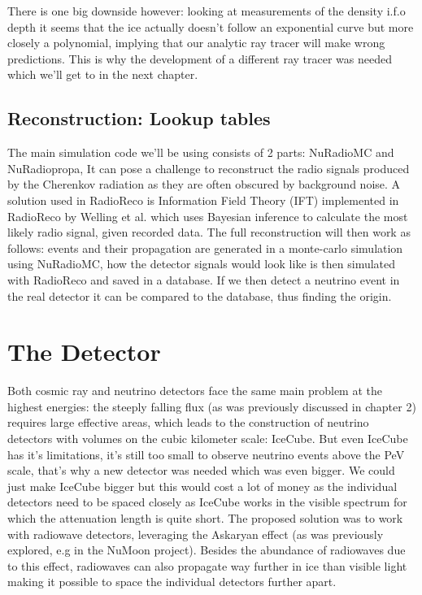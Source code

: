 \documentclass[11pt,a4paper,faculty=we,language=en,doctype=report]{cls/ugent-doc}
\begin{document}
There is one big downside however: looking at measurements of the density i.f.o depth
it seems that the ice actually doesn't follow an exponential curve but more closely
a polynomial, implying that our analytic ray tracer will make wrong predictions.
This is why the development of a different ray tracer was needed which we'll get to
in the next chapter.
\section{Reconstruction: Lookup tables}
The main simulation code we'll be using consists of 2 parts: 
NuRadioMC and NuRadiopropa,
It can pose a challenge to reconstruct the radio signals produced by
the Cherenkov radiation as they are often obscured by background
noise. A solution used in RadioReco is Information Field Theory
(IFT) implemented in RadioReco by Welling et al.\cite{Welling_2021}
which uses Bayesian inference to calculate the most likely radio
signal, given recorded data.  The full reconstruction will then work
as follows: events and their propagation are generated in a
monte-carlo simulation using
NuRadioMC\cite{Glaser_2019}\cite{Glaser_2020}, how the detector
signals would look like is then simulated with RadioReco and saved
in a database.  If we then detect a neutrino event in the real
detector it can be compared to the database, thus finding the
origin.
\chapter{The Detector}
Both cosmic ray and neutrino detectors face the same main problem at the
highest energies: the steeply falling flux (as was previously discussed in
chapter 2) requires large effective areas, which leads to the construction of
neutrino detectors with volumes on the cubic kilometer scale: IceCube.  But
even IceCube has it's limitations, it's still too small to observe neutrino
events above the PeV scale, that's why a new detector was needed which was even
bigger.  We could just make IceCube bigger but this would cost a lot of money
as the individual detectors need to be spaced closely as IceCube works in the
visible spectrum for which the attenuation length is quite short. The proposed
solution was to work with radiowave detectors, leveraging the Askaryan effect
(as was previously explored, e.g in the NuMoon project).  Besides the abundance
of radiowaves due to this effect, radiowaves can also propagate way further in
ice than visible light making it possible to space the individual detectors
further apart.
\end{document}

